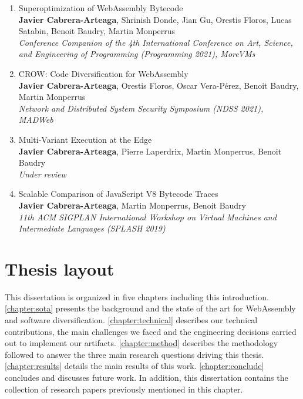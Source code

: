 \begin{enumerate}[label=\subscript{P}{{\arabic*}}]
    \item Superoptimization of WebAssembly Bytecode \cite{WasmSuperoptimizer}\\
    {\small\textbf{Javier Cabrera-Arteaga}, Shrinish Donde, Jian Gu, Orestis Floros, Lucas Satabin, Benoit Baudry, Martin Monperrus}\\
        \emph{Conference Companion of the 4th International Conference on Art, Science, and Engineering of Programming (Programming 2021), MoreVMs}

        \item CROW: Code Diversification for WebAssembly \cite{CROW}\\
    {\small\textbf{Javier Cabrera-Arteaga}, Orestis Floros, Oscar Vera-Pérez, Benoit Baudry, Martin Monperrus}\\
    \emph{Network and Distributed System Security Symposium (NDSS 2021), MADWeb}

    \item Multi-Variant Execution at the Edge \cite{MEWE}\\
    {\small\textbf{Javier Cabrera-Arteaga}, Pierre Laperdrix, Martin Monperrus, Benoit Baudry}\\
    \emph{Under review}

    \item Scalable Comparison of JavaScript V8 Bytecode Traces \cite{STRAC}\\
    {\small\textbf{Javier Cabrera-Arteaga}, Martin Monperrus, Benoit Baudry}\\
    \emph{11th ACM SIGPLAN International Workshop on Virtual Machines and Intermediate Languages (SPLASH 2019)}
\end{enumerate}

\section*{Thesis layout}

This dissertation is organized in five chapters including this introduction. \autoref{chapter:sota} presents the background and the state of the art for WebAssembly and software diversification.
\autoref{chapter:technical} describes our technical contributions, the main challenges we faced and the engineering decisions carried out to implement our artifacts. \autoref{chapter:method} describes the methodology followed to answer the three main
research questions driving this thesis. \autoref{chapter:results} details the main results of this work. \autoref{chapter:conclude} concludes and discusses future work. 
In addition, this dissertation contains the collection of research papers previously mentioned in this chapter.